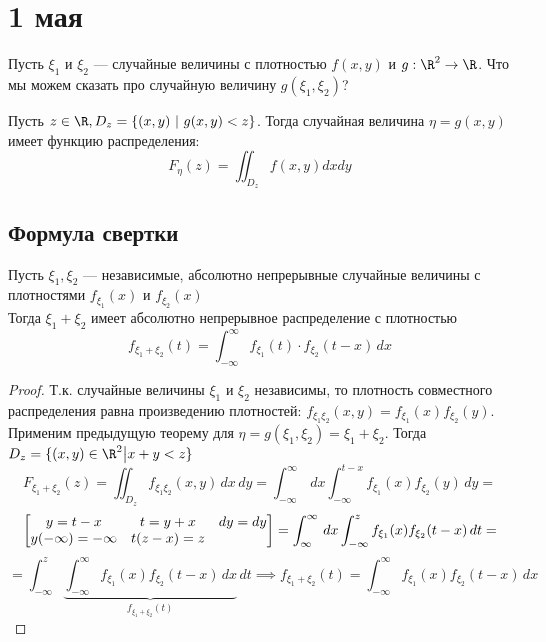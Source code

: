 \chapter{1 мая}

Пусть \(\xi_1\) и \(\xi_2\) --- случайные величины с плотностью \(f(x, y)\) и \(g : \R^2 \to \R\). Что мы можем сказать про случайную величину \(g(\xi_1, \xi_2)\)?

\begin{theorem}
    Пусть \(z \in \R, D_z = \{(x, y)\ |\ g(x, y) < z\}\). Тогда случайная величина \(\eta = g(x, y)\) имеет функцию распределения:
    \[F_\eta(z) = \iint_{D_z} f(x, y) dx dy\]
\end{theorem}

\section{Формула свертки}

\begin{theorem}
    Пусть \(\xi_1, \xi_2\) --- независимые, абсолютно непрерывные случайные величины с плотностями \(f_{\xi_1}(x)\) и \(f_{\xi_2}(x)\) \\
    Тогда \(\xi_1 + \xi_2\) имеет абсолютно непрерывное распределение с плотностью
    \[ f_{\xi_1 + \xi_2}(t) = \int_{-\infty}^\infty f_{\xi_1}(t)\cdot f_{\xi_2}(t - x)\,dx \]
\end{theorem}
\begin{proof}
    Т.к. случайные величины \(\xi_1\) и \(\xi_2\) независимы, то плотность совместного распределения равна произведению плотностей: \(f_{\xi_1\xi_2}(x, y) = f_{\xi_1}(x)f_{\xi_2}(y)\). Применим предыдущую теорему для \(\eta = g(\xi_1, \xi_2) = \xi_1 + \xi_2\). Тогда \(D_z = \{(x, y) \in \R^2 \big| x + y < z\}\)
    \[ F_{\xi_1 + \xi_2}(z) = \iint_{D_z} f_{\xi_1\xi_2}(x, y)\,dx\,dy = \int_{-\infty}^\infty \,dx \int_{-\infty}^{t - x} f_{\xi_1}(x) f_{\xi_2}(y)\,dy = \]
    \[ \left[\begin{matrix}
                y = t - x            & t = y + x    & dy = dy \\
                y(-\infty) = -\infty & t(z - x) = z &
            \end{matrix}\right] = \int_{\-\infty}^\infty\,dx\int_{-\infty}^z f_{\xi_1}(x)f_{\xi_2}(t - x)\,dt = \]
    \[ = \int_{-\infty}^z \underbrace{\int_{-\infty}^\infty f_{\xi_1}(x)f_{\xi_2}(t - x)\,dx}_{f_{\xi_1 + \xi_2}(t)} \,dt \implies f_{\xi_1 + \xi_2}(t) = \int_{-\infty}^\infty f_{\xi_1}(x)f_{\xi_2}(t - x)\,dx \]
\end{proof}

